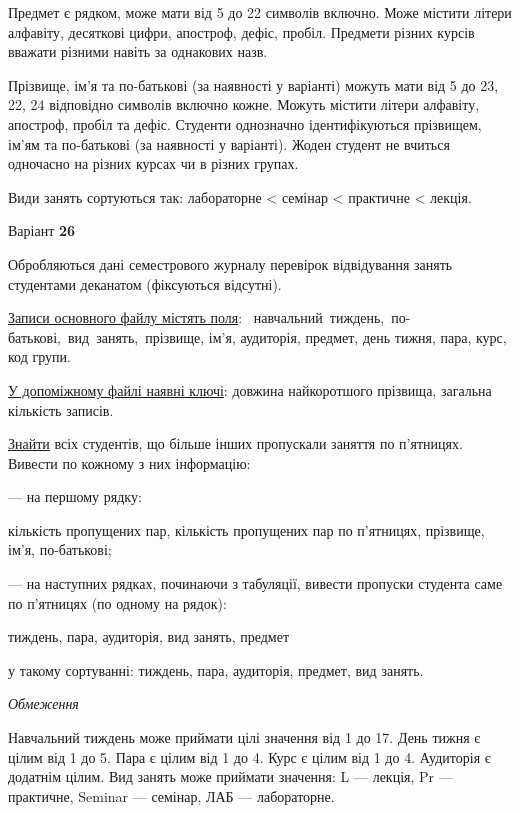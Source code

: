 \documentclass[11pt, ukrainian]{article}
\begin{document}
Предмет є рядком, може мати від 5 до 22 символів включно.
Може містити літери алфавіту, десяткові цифри, апостроф, дефіс, пробіл.
Предмети різних курсів вважати різними навіть за однакових назв.

Прізвище, ім’я та по-батькові (за наявності у варіанті)
можуть мати від 5 до 23, 22, 24 відповідно символів включно кожне.
Можуть містити літери алфавіту, апостроф, пробіл та дефіс.
Студенти однозначно ідентифікуються прізвищем, ім’ям та по-батькові (за наявності у варіанті).
Жоден студент не вчиться одночасно на різних курсах чи в різних групах.

Види занять сортуються так: лабораторне < семінар < практичне < лекція.



\par
\newpage
{\center Варіант  \No \textbf { 26 }\par}
\bigskip
Обробляються дані семестрового журналу перевірок відвідування занять студентами деканатом (фіксуються відсутні). 

\underline{Записи основного файлу містять поля}: \ навчальний\ тиждень,\ по-батькові,\ вид\ занять,\ прізвище, ім’я, аудиторія, предмет, день тижня, пара, курс, код групи.

\underline{У допоміжному файлі наявні ключі}: довжина найкоротшого прізвища, загальна кількість записів.

\underline{Знайти} всіх студентів, що більше інших пропускали заняття по п’ятницях. Вивести по кожному з них інформацію:\par
{\noindent}--- на першому рядку:\par
кількість пропущених пар, кількість пропущених пар по п’ятницях, прізвище, ім’я, по-батькові;

{\noindent}--- на наступних рядках, починаючи з табуляції, вивести пропуски студента саме по п’ятницях (по одному на рядок):\par
тиждень, пара, аудиторія, вид занять, предмет

{\noindent}у такому сортуванні: тиждень, пара, аудиторія, предмет, вид занять.


\bigskip\textit{Обмеження}

Навчальний тиждень може приймати цілі значення від 1 до 17.
День тижня є цілим від 1 до 5. Пара є цілим від 1 до 4.
Курс є цілим від 1 до 4. Аудиторія є додатнім цілим.
Вид занять може приймати значення:
L --- лекція, Pr --- практичне, Seminar --- семінар, ЛАБ --- лабораторне.
\end{document}
